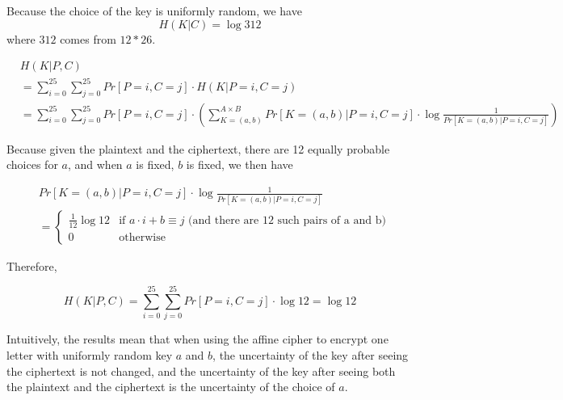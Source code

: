 \documentclass{article}
\begin{document}
Because the choice of the key is uniformly random, we have
$$H(K|C) = \log 312$$ where $312$ comes from $12*26$.

\begin{equation*}
    \begin{split}
        & H(K|P,C) \\
        & = \sum_{i=0}^{25} \sum_{j=0}^{25} Pr[P=i, C=j] \cdot H(K|P=i,C=j) \\
        & = \sum_{i=0}^{25} \sum_{j=0}^{25} Pr[P=i, C=j] \cdot \left( \sum_{K=(a,b)}^{A \times B} Pr[K=(a,b)|P=i,C=j] \cdot \log \frac{1}{Pr[K=(a,b)|P=i,C=j]} \right)
    \end{split}
\end{equation*}

Because given the plaintext and the ciphertext, there are 12 equally
probable choices for $a$, and when $a$ is fixed, $b$ is fixed,
we then have

\begin{equation*}
    \begin{split}
        & Pr[K=(a,b)|P=i,C=j] \cdot \log \frac{1}{Pr[K=(a,b)|P=i,C=j]}  \\
        & =
        \begin{cases}
            \frac{1}{12} \log 12 & \text{if } a \cdot i + b \equiv j \text{ (and there are 12 such pairs of a and b)} \\
            0                    & \text{otherwise}
        \end{cases}
    \end{split}
\end{equation*}


Therefore,

$$
    H(K|P,C) = \sum_{i=0}^{25} \sum_{j=0}^{25} Pr[P=i, C=j] \cdot \log 12 = \log 12
$$

Intuitively, the results mean that when using the affine cipher
to encrypt one letter with uniformly random key $a$ and $b$,
the uncertainty of the key after seeing the ciphertext is
not changed, and the uncertainty of the key after seeing both
the plaintext and the ciphertext is the uncertainty of the
choice of $a$.
\end{document}
